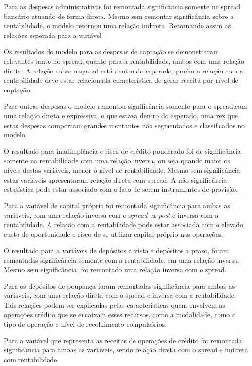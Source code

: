 \documentclass[
  12pt,
  12pt,
  openright,
  oneside,
  a4paper,
  chapter=TITLE,
  section=TITLE,
  subsection=TITLE,
  subsubsection=TITLE,
  english,
  portugues,
  sumario=tradicional]{abntex2}
\begin{document}
Para as despesas administrativas foi remontada significância somente no spread bancário atuando de forma direta. Mesmo sem remontar significância sobre a rentabilidade, o modelo retornou uma relação indireta. Retornando assim as relações esperada para a variável

Os resultados do modelo para as despesas de captação se demonstraram relevantes tanto no spread, quanto para a rentabilidade, ambos com uma relação direta. A relação sobre o spread está dentro do esperado, porém a relação com a rentabilidade deve estar relacionada característica de gerar receita por nível de captação.

Para outras despesas o modelo remontou significância somente para o spread,com uma relação direta e expressiva, o que estava dentro do esperado, uma vez que estas despesas comportam grandes montantes não segmentados e classificados no modelo.

O resultado para inadimplência e risco de crédito ponderado foi de significância somente na rentabilidade com uma relação inversa, ou seja quando maior os níveis destas variáveis, menor o nível de rentabilidade. Mesmo sem significância estas variáveis apresentaram relação direta com spread. A não significância estatística pode estar associado com o fato de serem instrumentos de provisão.

Para a variável de capital próprio foi remontada significância para ambas as variáveis, com uma relação inversa com o \emph{spread ex-post} e inversa com a rentabilidade. A relação com a rentabilidade pode estar associada com o elevado custo de oportunidade e risco de se utilizar capital próprio nas operações.

O resultado para a variáveis de depósitos a vista e depósitos a prazo, foram remontadas significância somente com a rentabilidade, em uma relação inversa. Mesmo sem significância, foi remontado uma relação inversa com o spread.

Para os depósitos de poupança foram remontadas significância para ambas as variáveis, com uma relação direta com o spread e inversa com a rentabilidade. Tais relações podem ser explicadas pelas características quem envolvem as operações crédito que se encaixam esses recursos, como a modalidade, como o tipo de operação e nível de recolhimento compulsórios.

Para a variável que representa as receitas de operações de crédito foi remontada significância para ambas as variáveis, sendo relação direta com o spread e indireta com rentabilidade.
\end{document}
